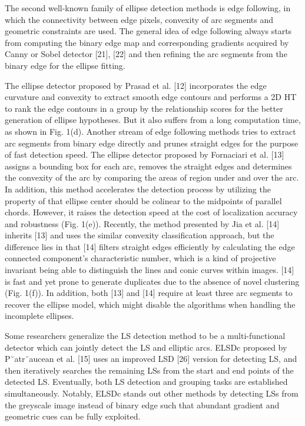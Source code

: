 \documentclass[a4paper]{report}
\begin{document}
The second well-known family of ellipse detection methods
is edge following, in which the connectivity between edge
pixels, convexity of arc segments and geometric constraints are
used. The general idea of edge following always starts from
computing the binary edge map and corresponding gradients
acquired by Canny or Sobel detector [21], [22] and then
refining the arc segments from the binary edge for the ellipse
fitting.

The
ellipse detector proposed by Prasad et al. [12] incorporates the
edge curvature and convexity to extract smooth edge contours
and performs a 2D HT to rank the edge contours in a group
by the relationship scores for the better generation of ellipse
hypotheses. But it also suffers from a long computation time,
as shown in Fig. 1(d).
Another stream of edge following methods tries to extract
arc segments from binary edge directly and prunes straight
edges for the purpose of fast detection speed. The ellipse
detector proposed by Fornaciari et al. [13] assigns a bounding
box for each arc, removes the straight edges and determines
the convexity of the arc by comparing the areas of region
under and over the arc. In addition, this method accelerates
the detection process by utilizing the property of that ellipse
center should be colinear to the midpoints of parallel chords.
However, it raises the detection speed at the cost of localization
accuracy and robustness (Fig. 1(e)). Recently, the method
presented by Jia et al. [14] inherits [13] and uses the similar
convexity classification approach, but the difference lies in
that [14] filters straight edges efficiently by calculating the
edge connected component’s characteristic number, which is a
kind of projective invariant being able to distinguish the lines
and conic curves within images. [14] is fast and yet prone
to generate duplicates due to the absence of novel clustering
(Fig. 1(f)). In addition, both [13] and [14] require at least three
arc segments to recover the ellipse model, which might disable
the algorithms when handling the incomplete ellipses.

Some researchers generalize the LS detection method to be
a multi-functional detector which can jointly detect the LS
and elliptic arcs. ELSDc proposed by P˘atr˘aucean et al. [15]
uses an improved LSD [26] version for detecting LS, and
then iteratively searches the remaining LSs from the start and
end points of the detected LS. Eventually, both LS detection
and grouping tasks are established simultaneously. Notably,
ELSDc stands out other methods by detecting LSs from the
greyscale image instead of binary edge such that abundant
gradient and geometric cues can be fully exploited.

 

\end{document}
